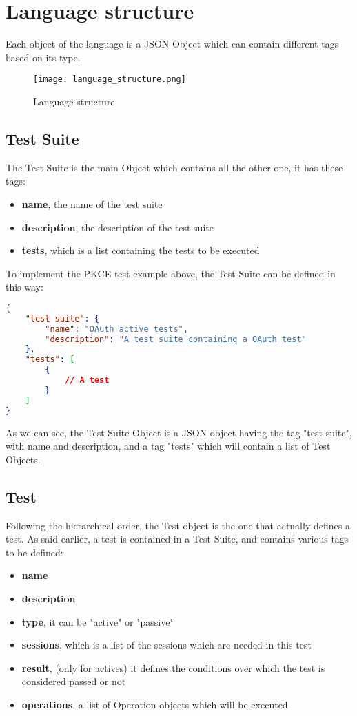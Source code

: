 \section{Language structure}
Each object of the language is a JSON Object which can contain different tags based on its type.
\begin{figure}
    \texttt{[image: language\_structure.png]}
    \caption{Language structure}
    \label{fig:language_structure}
\end{figure}


\subsection{Test Suite}
The Test Suite is the main Object which contains all the other one, it has these tags:
\begin{itemize}
    \item \textbf{name}, the name of the test suite
    \item \textbf{description}, the description of the test suite
    \item \textbf{tests}, which is a list containing the tests to be executed
\end{itemize}
To implement the PKCE test example above, the Test Suite can be defined in this way:

\begin{lstlisting}[language=json, caption=Test Suite definition]
{
    "test suite": {
        "name": "OAuth active tests",
        "description": "A test suite containing a OAuth test"
    },
    "tests": [
        {
            // A test
        }
    ]
}
\end{lstlisting}

As we can see, the Test Suite Object is a JSON object having the tag "test suite", with name and description, and a tag "tests" which will contain a list of Test Objects.

\subsection{Test}
Following the hierarchical order, the Test object is the one that actually defines a test. As said earlier, a test is contained in a Test Suite, and contains various tags to be defined:
\begin{itemize}
    \item \textbf{name}
    \item \textbf{description}
    \item \textbf{type}, it can be "active" or "passive"
    \item \textbf{sessions}, which is a list of the sessions which are needed in this test
    \item \textbf{result}, (only for actives) it defines the conditions over which the test is considered passed or not
    \item \textbf{operations}, a list of Operation objects which will be executed
\end{itemize}

